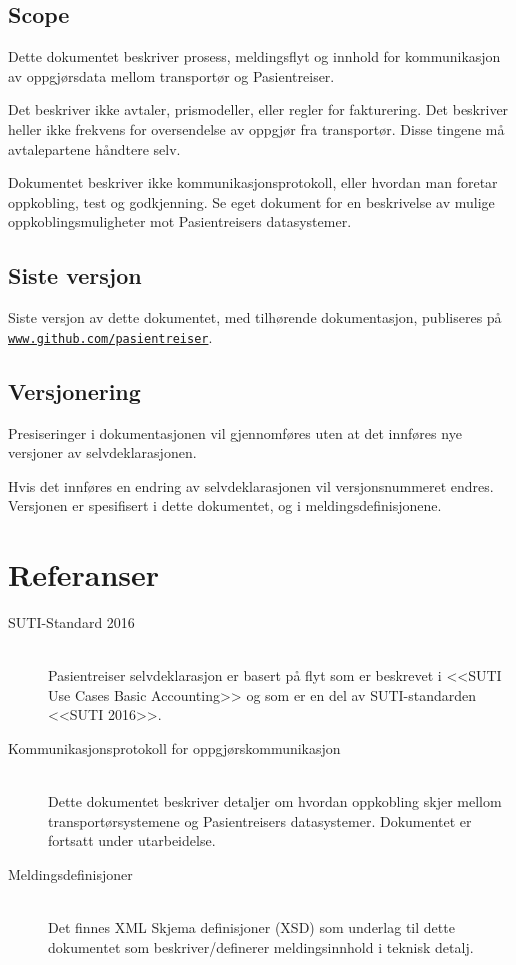 \documentclass[a4paper,titlepage,norsk,11pt]{article}
\begin{document}
\subsection{Scope}
Dette dokumentet beskriver prosess, meldingsflyt og innhold for kommunikasjon av oppgjørsdata mellom transportør og Pasientreiser.

Det beskriver ikke avtaler, prismodeller, eller regler for fakturering. Det beskriver heller ikke frekvens for oversendelse av oppgjør fra transportør. Disse tingene må avtalepartene håndtere selv.

Dokumentet beskriver ikke kommunikasjonsprotokoll, eller hvordan man foretar oppkobling, test og godkjenning. Se eget dokument for en beskrivelse av mulige oppkoblingsmuligheter mot Pasientreisers datasystemer.

\subsection{Siste versjon}

Siste versjon av dette dokumentet, med tilhørende dokumentasjon, publiseres på \href{http://www.github.com/pasientreiser}{\nolinkurl{www.github.com/pasientreiser}}.

\subsection{Versjonering}

Presiseringer i dokumentasjonen vil gjennomføres uten at det innføres nye versjoner av selvdeklarasjonen.

Hvis det innføres en endring av selvdeklarasjonen vil versjonsnummeret endres. Versjonen er spesifisert i dette dokumentet, og i meldingsdefinisjonene.

\section{Referanser}

\begin{description}

  \item[SUTI-Standard 2016] \hfill \\
  Pasientreiser selvdeklarasjon er basert på flyt som er beskrevet i <<SUTI Use Cases Basic Accounting>> og som er en del av SUTI-standarden <<SUTI 2016>>.

  \item[Kommunikasjonsprotokoll for oppgjørskommunikasjon] \hfill \\
  Dette dokumentet beskriver detaljer om hvordan oppkobling skjer mellom transportørsystemene og Pasientreisers datasystemer. Dokumentet er fortsatt under utarbeidelse.

  \item[Meldingsdefinisjoner] \hfill \\
  Det finnes XML Skjema definisjoner (XSD) som underlag til dette dokumentet som beskriver/definerer meldingsinnhold i teknisk detalj.

\end{description}
\end{document}
